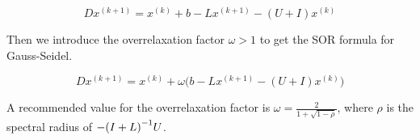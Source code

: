 $$ Dx^{(k+1)} = x^{(k)} + b - Lx^{(k+1)} - (U + I)x^{(k)} $$

Then we introduce the overrelaxation factor $\omega > 1$ to get the SOR formula 
for Gauss-Seidel.

$$ Dx^{(k+1)} = x^{(k)} + \omega \big( b - Lx^{(k+1)} - (U + I)x^{(k)} \big) $$

A recommended value for the overrelaxation factor is $\omega = \frac{2}{1 +
\sqrt{1 - \rho}} $, where $\rho$ is the spectral radius of $-{(I + L)}^{-1}U$\cite{Kreyszig}. 
